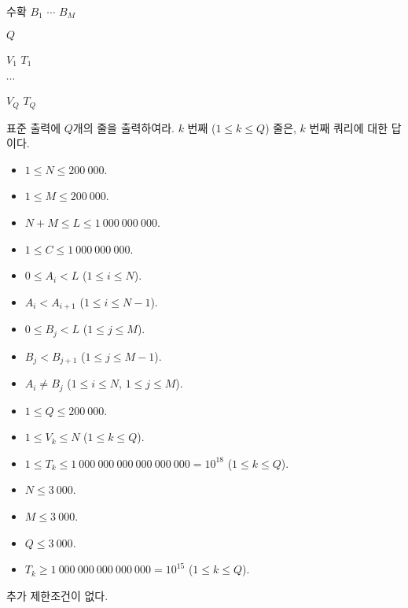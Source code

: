 \begin{problem}{수확}
	$B_1$ $\cdots$ $B_M$
	
	$Q$
	
	$V_1$ $T_1$
	
	$\cdots$

	$V_Q$ $T_Q$
	
	
	\OutputFile
	
	표준 출력에 $Q$개의 줄을 출력하여라. $k$ 번째 ($1 \le k \le Q$) 줄은, $k$ 번째 쿼리에 대한 답이다.
	

	\Constraints


	\begin{itemize}
		\item $1 \le N \le 200\ 000$.
		\item $1 \le M \le 200\ 000$.
		\item $N+M \le L \le 1\ 000\ 000\ 000$.
		\item $1 \le C \le 1\ 000\ 000\ 000$.
		\item $0 \le A_i < L$ ($1 \le i \le N$).
		\item $A_i < A_{i+1}$ ($1 \le i \le N-1$).
		\item $0 \le B_j < L$ ($1 \le j \le M$).
		\item $B_j < B_{j+1}$ ($1 \le j \le M-1$).
		\item $A_i \ne B_j$ ($1 \le i \le N$, $1 \le j \le M$).
		\item $1 \le Q \le 200\ 000$.
		\item $1 \le V_k \le N$ ($1 \le k \le Q$).
		\item $1 \le T_k \le 1\ 000\ 000\ 000\ 000\ 000\ 000 = 10^{18}$ ($1 \le k \le Q$).
	\end{itemize}


	\begin{itemize}
		\item $N \le 3\ 000$.
		\item $M \le 3\ 000$.
		\item $Q \le 3\ 000$.
	\end{itemize}

	
	\begin{itemize}
		\item $T_k \ge 1\ 000\ 000\ 000\ 000\ 000 = 10^{15}$ ($1 \le k \le Q$).
	\end{itemize}
	
	
	추가 제한조건이 없다.
		
	\Examples
		
	\begin{example}
\end{example}


\end{problem}
